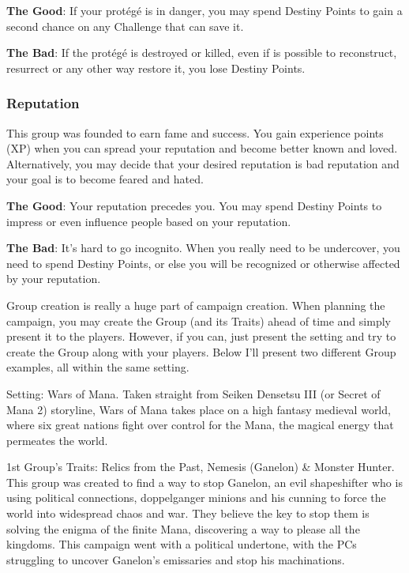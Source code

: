 \begin{multicols}{2}
\textbf{The Good}: If your protégé is in danger, you
may spend Destiny Points to gain a second chance
on any Challenge that can save it.

\textbf{The Bad}: If the protégé is destroyed or
killed, even if is possible to reconstruct, resurrect
or any other way restore it, you lose Destiny Points.

\subsubsection{Reputation}
This group was founded to earn fame and
success. You gain experience points (XP) when you
can spread your reputation and become better
known and loved. Alternatively, you may decide
that your desired reputation is bad reputation and
your goal is to become feared and hated.

\textbf{The Good}: Your reputation precedes you.
You may spend Destiny Points to impress or even
influence people based on your reputation.

\textbf{The Bad}: It's hard to go incognito. When
you really need to be undercover, you need to
spend Destiny Points, or else you will be
recognized or otherwise affected by your
reputation.

\begin{mog}
Group creation is really a huge part of campaign
creation. When planning the campaign, you may create
the Group (and its Traits) ahead of time and simply
present it to the players. However, if you can, just present
the setting and try to create the Group along with your
players. Below I'll present two different Group examples,
all within the same setting.

Setting: Wars of Mana. Taken straight from Seiken
Densetsu III (or Secret of Mana 2) storyline, Wars of
Mana takes place on a high fantasy medieval world, where
six great nations fight over control for the Mana, the
magical energy that permeates the world.

1st Group's Traits: Relics from the Past, Nemesis
(Ganelon) \& Monster Hunter. This group was created to
find a way to stop Ganelon, an evil shapeshifter who is
using political connections, doppelganger minions and his
cunning to force the world into widespread chaos and war.
They believe the key to stop them is solving the enigma
of the finite Mana, discovering a way to please all the
kingdoms. This campaign went with a political undertone,
with the PCs struggling to uncover Ganelon's emissaries
and stop his machinations.


\end{mog}
\end{multicols}
